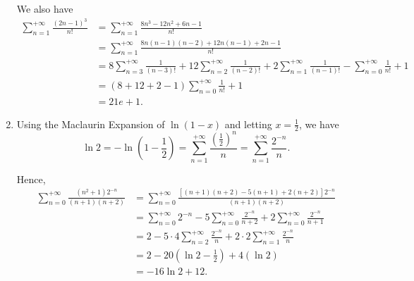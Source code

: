 \begin{enumerate}
          We also have
          \begin{align*}
              \sum_{n = 1}^{+\infty} \frac{(2n - 1)^3}{n!} & = \sum_{n = 1}^{+\infty} \frac{8n^3 - 12n^2 + 6n - 1}{n!}                                                                                                                           \\
                                                           & = \sum_{n = 1}^{+\infty} \frac{8n(n - 1)(n - 2) + 12 n (n - 1) + 2n - 1}{n!}                                                                                                        \\
                                                           & = 8 \sum_{n = 3}^{+\infty} \frac{1}{(n - 3)!} + 12 \sum_{n = 2}^{+\infty} \frac{1}{(n - 2)!} + 2 \sum_{n = 1}^{+\infty} \frac{1}{(n - 1)!} - \sum_{n = 0}^{+\infty}\frac{1}{n!} + 1 \\
                                                           & = (8 + 12 + 2 - 1) \sum_{n = 0}^{+\infty} \frac{1}{n!} + 1                                                                                                                          \\
                                                           & = 21e + 1.
          \end{align*}

    \item Using the Maclaurin Expansion of \(\ln(1 - x)\) and letting \(x = \frac{1}{2}\), we have
          \[
              \ln 2 = - \ln \left(1 - \frac{1}{2}\right) = \sum_{n = 1}^{+\infty} \frac{\left(\frac{1}{2}\right)^n}{n} =  \sum_{n = 1}^{+\infty} \frac{2^{-n}}{n}.
          \]

          Hence,
          \begin{align*}
              \sum_{n = 0}^{+\infty} \frac{(n^2 + 1) 2^{-n}}{(n + 1)(n + 2)} & = \sum_{n = 0}^{+\infty} \frac{[(n + 1)(n + 2) - 5(n + 1) + 2(n + 2)]2^{-n}}{(n + 1)(n + 2)}                                   \\
                                                                             & = \sum_{n = 0}^{+\infty} 2^{-n} - 5\sum_{n = 0}^{+\infty} \frac{2^{-n}}{n + 2} + 2 \sum_{n = 0}^{+\infty} \frac{2^{-n}}{n + 1} \\
                                                                             & = 2 - 5 \cdot 4 \sum_{n = 2}^{+\infty} \frac{2^{-n}}{n} + 2 \cdot 2 \sum_{n = 1}^{+\infty} \frac{2^{-n}}{n}                    \\
                                                                             & = 2 - 20 (\ln 2 - \frac{1}{2}) +4 (\ln 2)                                                                                      \\
                                                                             & = -16 \ln 2 + 12.
          \end{align*}
\end{enumerate}